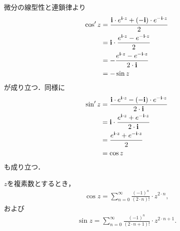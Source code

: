 	\begin{sketch}
		微分の線型性と連鎖律より
		\begin{align}
			\cos'{z}
			&= \frac{\mathbf{i} \cdot e^{\mathbf{i} \cdot z} + (-\mathbf{i}) \cdot e^{-\mathbf{i} \cdot z}}{2} \\
			&= \mathbf{i} \cdot \frac{e^{\mathbf{i} \cdot z} - e^{-\mathbf{i} \cdot z}}{2} \\
			&= -\frac{e^{\mathbf{i} \cdot z} - e^{-\mathbf{i} \cdot z}}{2 \cdot \mathbf{i}} \\
			&= -\sin{z}
		\end{align}
		が成り立つ．同様に
		\begin{align}
			\sin'{z}
			&= \frac{\mathbf{i} \cdot e^{\mathbf{i} \cdot z} - (-\mathbf{i}) \cdot e^{-\mathbf{i} \cdot z}}{2 \cdot \mathbf{i}} \\
			&= \mathbf{i} \cdot \frac{e^{\mathbf{i} \cdot z} + e^{-\mathbf{i} \cdot z}}{2 \cdot \mathbf{i}} \\
			&= \frac{e^{\mathbf{i} \cdot z} + e^{-\mathbf{i} \cdot z}}{2} \\
			&= \cos{z}
		\end{align}
		も成り立つ．
		\QED
	\end{sketch}
	
	\begin{screen}
		\begin{thm}[余弦と正弦の級数表示]
			$z$を複素数とするとき，
			\begin{align}
				\cos{z} = \sum_{n=0}^\infty \frac{(-1)^{n}}{(2 \cdot n)!} \cdot z^{2 \cdot n},
			\end{align}
			および
			\begin{align}
				\sin{z} = \sum_{n=0}^\infty \frac{(-1)^{n}}{(2 \cdot n + 1)!} \cdot z^{2 \cdot n + 1}.
			\end{align}
		\end{thm}
	\end{screen}
	

